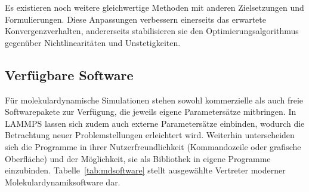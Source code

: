 Es existieren noch weitere gleichwertige Methoden mit anderen Zielsetzungen und Formulierungen.
Diese Anpassungen verbessern einerseits das erwartete Konvergenzverhalten, andererseits stabilisieren sie den Optimierungsalgorithmus gegenüber Nichtlinearitäten und Unstetigkeiten.







\subsection{Verfügbare Software}

Für molekulardynamische Simulationen stehen sowohl kommerzielle als auch freie Softwarepakete zur Verfügung, die jeweils eigene Parametersätze mitbringen.
In LAMMPS lassen sich zudem auch externe Parametersätze einbinden, wodurch die Betrachtung neuer Problemstellungen erleichtert wird.
Weiterhin unterscheiden sich die Programme in ihrer Nutzerfreundlichkeit (Kommandozeile oder grafische Oberfläche) und der Möglichkeit, sie als Bibliothek in eigene Programme einzubinden.
Tabelle~\ref{tab:mdsoftware} stellt ausgewählte Vertreter moderner Molekulardynamiksoftware dar.

